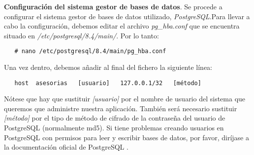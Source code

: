 \item \textbf{Configuración del sistema gestor de bases de datos}.
   Se procede a configurar el sistema gestor de bases de datos utilizado,
   \textit{PostgreSQL}.Para llevar a cabo la configuración, debemos editar
   el archivo \textit{pg\_hba.conf} que se encuentra situado en
   \textit{/etc/postgresql/8.4/main/}. Por lo tanto:

   \begin{verbatim}
   # nano /etc/postgresql/8.4/main/pg_hba.conf
   \end{verbatim}

   Una vez dentro, debemos añadir al final del fichero la siguiente línea:

   \begin{verbatim}
   host  asesorias   [usuario]   127.0.0.1/32   [método]
   \end{verbatim}

   Nótese que hay que sustituir \textit{[usuario]} por el nombre de usuario del
   sistema que queremos que administre nuestra aplicación. También será
   necesario sustituir \textit{[método]} por el tipo de método de cifrado de la
   contraseña del usuario de PostgreSQL (normalmente md5). Si tiene problemas
   creando usuarios en PostgreSQL con permisos para leer y escribir bases de
   datos, por favor, diríjase a la documentación oficial de PostgreSQL
   \cite{postgresql}.